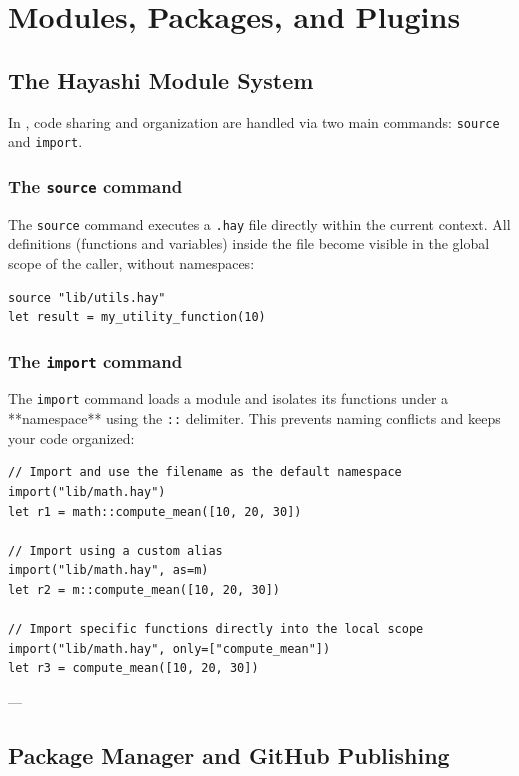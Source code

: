 \chapter{Modules, Packages, and Plugins}

\section{The Hayashi Module System}

In \hayashi{}, code sharing and organization are handled via two main commands: \lstinline{source} and \lstinline{import}.

\subsection{The \texttt{source} command}
The \lstinline{source} command executes a \texttt{.hay} file directly within the current context. All definitions (functions and variables) inside the file become visible in the global scope of the caller, without namespaces:

\begin{lstlisting}[caption={Basic usage of source}]
source "lib/utils.hay"
let result = my_utility_function(10)
\end{lstlisting}

\subsection{The \texttt{import} command}
The \lstinline{import} command loads a module and isolates its functions under a **namespace** using the \texttt{::} delimiter. This prevents naming conflicts and keeps your code organized:

\begin{lstlisting}[caption={Importing with namespaces}]
// Import and use the filename as the default namespace
import("lib/math.hay")
let r1 = math::compute_mean([10, 20, 30])

// Import using a custom alias
import("lib/math.hay", as=m)
let r2 = m::compute_mean([10, 20, 30])

// Import specific functions directly into the local scope
import("lib/math.hay", only=["compute_mean"])
let r3 = compute_mean([10, 20, 30])
\end{lstlisting}

---

\section{Package Manager and GitHub Publishing}

